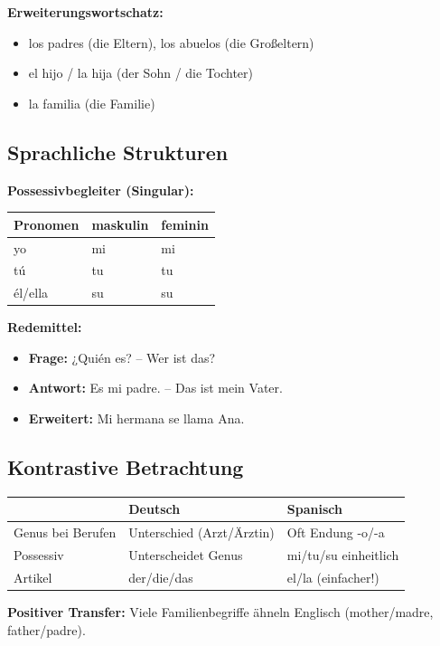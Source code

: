 \documentclass[11pt,a4paper]{article}
\begin{document}
\textbf{Erweiterungswortschatz:}
\begin{itemize}
    \item los padres (die Eltern), los abuelos (die Großeltern)
    \item el hijo / la hija (der Sohn / die Tochter)
    \item la familia (die Familie)
\end{itemize}

\subsection{Sprachliche Strukturen}

\textbf{Possessivbegleiter (Singular):}
\begin{center}
\begin{tabular}{|l|l|l|}
\hline
\textbf{Pronomen} & \textbf{maskulin} & \textbf{feminin} \\
\hline
yo & mi & mi \\
tú & tu & tu \\
él/ella & su & su \\
\hline
\end{tabular}
\end{center}

\textbf{Redemittel:}
\begin{itemize}
    \item \textbf{Frage:} ¿Quién es? -- Wer ist das?
    \item \textbf{Antwort:} Es mi padre. -- Das ist mein Vater.
    \item \textbf{Erweitert:} Mi hermana se llama Ana.
\end{itemize}

\subsection{Kontrastive Betrachtung}

\begin{tabular}{|l|p{5cm}|p{5cm}|}
\hline
& \textbf{Deutsch} & \textbf{Spanisch} \\
\hline
Genus bei Berufen & Unterschied (Arzt/Ärztin) & Oft Endung -o/-a \\
\hline
Possessiv & Unterscheidet Genus & mi/tu/su einheitlich \\
\hline
Artikel & der/die/das & el/la (einfacher!) \\
\hline
\end{tabular}

\textbf{Positiver Transfer:} Viele Familienbegriffe ähneln Englisch (mother/madre, father/padre).
\end{document}
